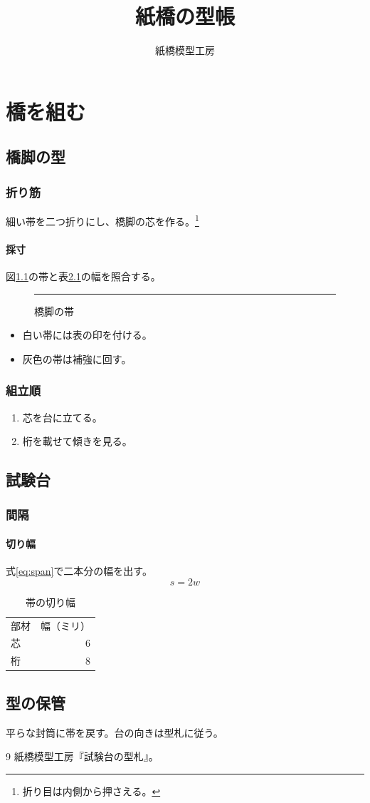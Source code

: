 \documentclass{ltjsbook}
\title{紙橋の型帳}
\author{紙橋模型工房}
\date{}
\begin{document}
\frontmatter
\maketitle
\tableofcontents
\mainmatter
\part{橋を組む}
\chapter{橋脚の型}
\section{折り筋}
細い帯を二つ折りにし、橋脚の芯を作る。\footnote{折り目は内側から押さえる。}
\subsection{採寸}
図\ref{fig:strip}の帯と表\ref{tab:cuts}の幅を照合する。
\begin{figure}[htbp]
\centering\rule{32mm}{3mm}
\caption{橋脚の帯}\label{fig:strip}
\end{figure}
\begin{itemize}
\item 白い帯には表の印を付ける。
\item 灰色の帯は補強に回す。
\end{itemize}
\newpage
\section{組立順}
\begin{enumerate}
\item 芯を台に立てる。
\item 桁を載せて傾きを見る。
\end{enumerate}
\chapter{試験台}
\section{間隔}
\subsection{切り幅}
式\ref{eq:span}で二本分の幅を出す。
\begin{equation}\label{eq:span}
s=2w
\end{equation}
\begin{table}[htbp]
\centering\caption{帯の切り幅}\label{tab:cuts}
\begin{tabular}{lr}部材 & 幅（ミリ）\\芯 & 6\\桁 & 8\end{tabular}
\end{table}
\appendix
\chapter{型の保管}
平らな封筒に帯を戻す。台の向きは型札に従う\cite{tag}。
\backmatter
\begin{thebibliography}{9}
 紙橋模型工房『試験台の型札』。
\end{thebibliography}
\end{document}
